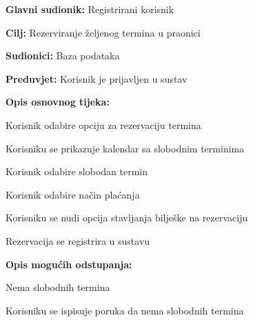 \noindent {}
\begin{packed_item}
	
	\item \textbf{Glavni sudionik: } Registrirani korisnik
	\item  \textbf{Cilj:} Rezerviranje željenog termina u praonici
	\item  \textbf{Sudionici:} Baza podataka
	\item  \textbf{Preduvjet:} Korisnik je prijavljen u sustav
	\item  \textbf{Opis osnovnog tijeka:}
	
	\item[] \begin{packed_enum}
		
		\item Korisnik odabire opciju za rezervaciju termina
		\item Korisniku se prikazuje kalendar sa slobodnim terminima
		\item Korisnik odabire slobodan termin
		\item Korisnik odabire način plaćanja
		\item Korisniku se nudi opcija stavljanja bilješke na rezervaciju
		\item Rezervacija se registrira u sustavu
		
	\end{packed_enum}
	
	\item  \textbf{Opis mogućih odstupanja:}
	
	\item[] \begin{packed_item}
		
		
		\item[2.a] Nema slobodnih termina
		\item[] \begin{packed_enum}
			
			\item Korisniku se ispisuje poruka da nema slobodnih termina
			
		\end{packed_enum}
		
	\end{packed_item}
\end{packed_item}

